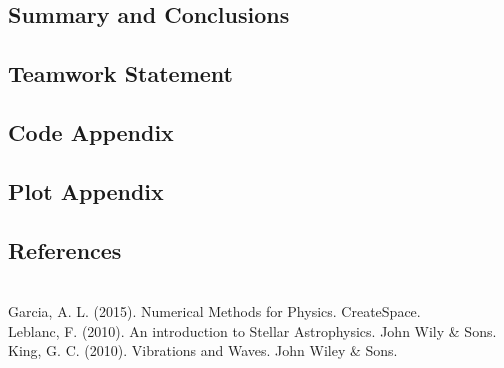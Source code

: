 \documentclass[letter,11pt]{article}
\begin{document}
\subsection*{Summary and Conclusions}

\begin{thebibliography}{99}
\end{thebibliography}

\subsection*{Teamwork Statement}

\subsection*{Code Appendix}

\subsection*{Plot Appendix}


\subsection*{References}\\

  \tab Garcia, A. L. (2015). Numerical Methods for Physics. CreateSpace.\\

  Leblanc, F. (2010). An introduction to Stellar Astrophysics. John Wily & Sons.\\

  King, G. C. (2010). Vibrations and Waves. John Wiley & Sons.
\end{document}
